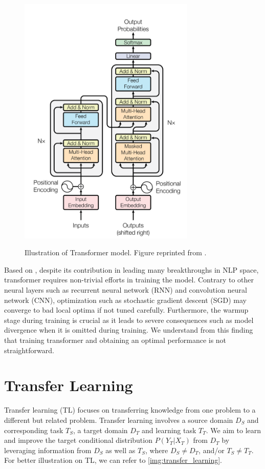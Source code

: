 \begin{figure}[h]
    {\includegraphics[width=0.75\textwidth]{img/transformer.png}}
    \centering
    \caption{Illustration of Transformer model. Figure reprinted from .}
    \label{img:transformer}
\end{figure}

Based on , despite its contribution in leading many breakthroughs in NLP space, transformer requires non-trivial efforts in training the model. Contrary to other neural layers such as recurrent neural network (RNN) and convolution neural network (CNN), optimization such as stochastic gradient descent (SGD) may converge to bad local optima if not tuned carefully. Furthermore, the warmup stage during training is crucial as it leads to severe consequences such as model divergence when it is omitted during training. We understand from this finding that training transformer and obtaining an optimal performance is not straightforward.

\section{Transfer Learning}
\label{sec:bm_tl}
Transfer learning (TL) focuses on transferring knowledge from one problem to a different but related problem. Transfer learning involves a source domain $D_S$ and corresponding task $T_S$, a target domain $D_T$ and learning task $T_T$. We aim to learn and improve the target conditional distribution $P(Y_T|X_T)$ from $D_T$ by leveraging information from $D_S$ as well as $T_S$, where $D_S \neq D_T$, and/or $T_S \neq T_T$. For better illustration on TL, we can refer to \cref{img:transfer_learning}.

